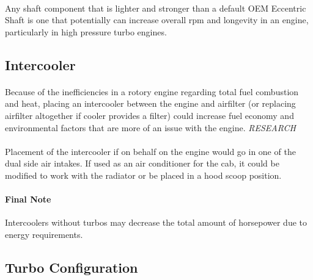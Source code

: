 \documentclass[a4paper,10pt]{report}
\begin{document}
\paragraph*{}Any shaft component that is lighter and stronger than a default OEM Eccentric Shaft is one that potentially can increase overall rpm and longevity in an engine, particularly in high pressure turbo engines.
\subsection{Intercooler} 
\paragraph*{}Because of the inefficiencies in a rotory engine regarding total fuel combustion and heat, placing an intercooler between the engine and airfilter (or replacing airfilter altogether if cooler provides a filter) could increase fuel economy and environmental factors that are more of an issue with the engine. \textit{RESEARCH}
\paragraph*{}Placement of the intercooler if on behalf on the engine would go in one of the dual side air intakes. If used as an air conditioner for the cab, it could be modified to work with the radiator or be placed in a hood scoop position.
\paragraph*{Final Note} Intercoolers without turbos may decrease the total amount of horsepower due to energy requirements.
\subsection{Turbo Configuration} 
\end{document}
